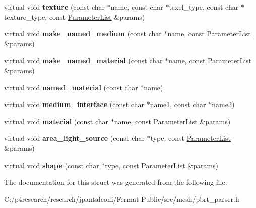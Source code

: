 \begin{DoxyCompactItemize}
virtual void {\bfseries texture} (const char $\ast$name, const char $\ast$texel\+\_\+type, const char $\ast$texture\+\_\+type, const \hyperlink{structpbrt_1_1_parameter_list}{Parameter\+List} \&params)
\item 
\mbox{\label{structpbrt_1_1_importer_acb3a4f9ba24c999bf9f6e3787cb4cc2a}} 
virtual void {\bfseries make\+\_\+named\+\_\+medium} (const char $\ast$name, const \hyperlink{structpbrt_1_1_parameter_list}{Parameter\+List} \&params)
\item 
\mbox{\label{structpbrt_1_1_importer_a1a4693fdf6dbbcb0e571297c084e936b}} 
virtual void {\bfseries make\+\_\+named\+\_\+material} (const char $\ast$name, const \hyperlink{structpbrt_1_1_parameter_list}{Parameter\+List} \&params)
\item 
\mbox{\label{structpbrt_1_1_importer_abd1bd89bfc23ecc43c688fd35d92185e}} 
virtual void {\bfseries named\+\_\+material} (const char $\ast$name)
\item 
\mbox{\label{structpbrt_1_1_importer_af3a4ab3561ad85ec1438692a22160610}} 
virtual void {\bfseries medium\+\_\+interface} (const char $\ast$name1, const char $\ast$name2)
\item 
\mbox{\label{structpbrt_1_1_importer_a0e600c8c11fdddae93636c9254e948f2}} 
virtual void {\bfseries material} (const char $\ast$name, const \hyperlink{structpbrt_1_1_parameter_list}{Parameter\+List} \&params)
\item 
\mbox{\label{structpbrt_1_1_importer_a2cef6f2f065371857e1dda4a7058eed8}} 
virtual void {\bfseries area\+\_\+light\+\_\+source} (const char $\ast$type, const \hyperlink{structpbrt_1_1_parameter_list}{Parameter\+List} \&params)
\item 
\mbox{\label{structpbrt_1_1_importer_a342f3716521d7f889f3d88413aa8d2b5}} 
virtual void {\bfseries shape} (const char $\ast$type, const \hyperlink{structpbrt_1_1_parameter_list}{Parameter\+List} \&params)
\end{DoxyCompactItemize}


The documentation for this struct was generated from the following file\+:\begin{DoxyCompactItemize}
\item 
C\+:/p4research/research/jpantaleoni/\+Fermat-\/\+Public/src/mesh/pbrt\+\_\+parser.\+h\end{DoxyCompactItemize}
